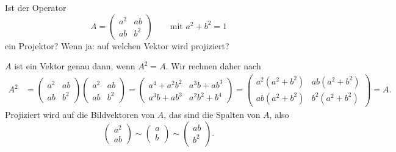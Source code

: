 Ist der Operator 
\[
A=
\begin{pmatrix}
a^2&ab\\
 ab&b^2
\end{pmatrix}
\qquad\text{mit $a^2+b^2=1$}
\]
ein Projektor?
Wenn ja: auf welchen Vektor wird projiziert?

\begin{loesung}
$A$ ist ein Vektor genau dann, wenn $A^2=A$. Wir rechnen daher nach
\begin{align*}
A^2
&=
\begin{pmatrix}
a^2&ab\\
 ab&b^2
\end{pmatrix}
\begin{pmatrix}
a^2&ab\\
 ab&b^2
\end{pmatrix}
=
\begin{pmatrix}
 a^4+a^2b^2&  a^3b+ab^3\\
a^3b+ab^3  &a^2b^2+b^4
\end{pmatrix}
=
\begin{pmatrix}
a^2(a^2+b^2)& ab(a^2+b^2)\\
 ab(a^2+b^2)&b^2(a^2+b^2)
\end{pmatrix}
=A.
\end{align*}
Projiziert wird auf die Bildvektoren von $A$, das sind die Spalten von
$A$, also
\[
\begin{pmatrix}a^2\\ab\end{pmatrix}
\sim
\begin{pmatrix}a\\b\end{pmatrix}
\sim
\begin{pmatrix}ab\\b^2\end{pmatrix}.
\]
\end{loesung}


